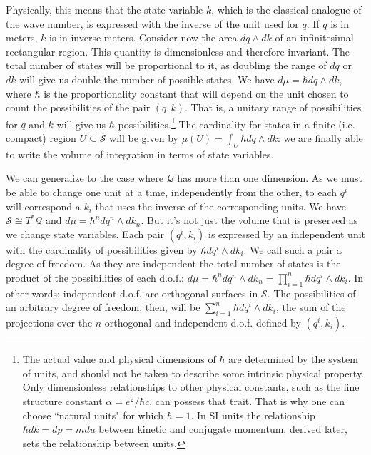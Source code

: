 \documentclass[aps,pra,10pt,twocolumn,floatfix,nofootinbib]{revtex4-1}
\numberwithin{equation}{section}
\theoremstyle{definition}
\begin{document}
Physically, this means that the state variable $k$, which is the classical analogue of the wave number, is expressed with the inverse of the unit used for $q$. If $q$ is in meters, $k$ is in inverse meters. Consider now the area $dq \wedge dk$ of an infinitesimal rectangular region. This quantity is dimensionless and therefore invariant. The total number of states will be proportional to it, as  doubling the range of $dq$ or $dk$ will give us double the number of possible states. We have $d\mu = \hbar dq \wedge dk$, where $\hbar$ is the proportionality constant that will depend on the unit chosen to count the possibilities of the pair $(q, k)$. That is, a unitary range of possibilities for $q$ and $k$ will give us $\hbar$ possibilities.\footnote{The actual value and physical dimensions of $\hbar$ are determined by the system of units, and should not be taken to describe some intrinsic physical property. Only dimensionless relationships to other physical constants, such as the fine structure constant $\alpha = e^2/\hbar c$, can possess that trait. That is why one can choose ``natural units" for which $\hbar=1$. In SI units the relationship $\hbar dk = dp = m du$ between kinetic and conjugate momentum, derived later, sets the relationship between units.} The cardinality for states in a finite (i.e. compact) region $U \subseteq \mathcal{S}$ will be given by $\mu(U) = \int_U \hbar dq \wedge dk$: we are finally able to write the volume of integration in terms of state variables.

We can generalize to the case where $\mathcal{Q}$ has more than one dimension. As we must be able to change one unit at a time, independently from the other, to each $q^i$ will correspond a $k_i$ that uses the inverse of the corresponding units. We have $\mathcal{S}\cong T^*\mathcal{Q}$ and $d\mu = \hbar^n dq^n \wedge dk_n$. But it's not just the volume that is preserved as we change state variables. Each pair $(q^i, k_i)$ is expressed by an independent unit with the cardinality of possibilities given by $\hbar dq^i \wedge dk_i$. We call such a pair a degree of freedom. As they are independent the total number of states is the product of the possibilities of each d.o.f.: $d\mu = \hbar^n dq^n \wedge dk_n = \prod \limits_{i=1}^n \hbar dq^i \wedge dk_i$. In other words: independent d.o.f. are orthogonal surfaces in $\mathcal{S}$. The possibilities of an arbitrary degree of freedom, then, will be $\sum \limits_{i=1}^n \hbar dq^i \wedge dk_i$, the sum of the projections over the $n$ orthogonal and independent d.o.f. defined by $(q^i, k_i)$.
\end{document}
